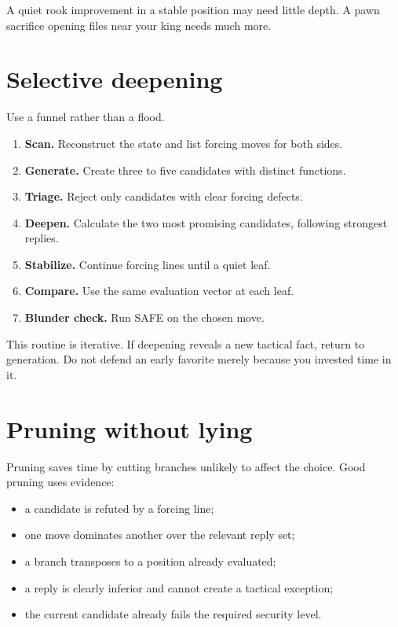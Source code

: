 A quiet rook improvement in a stable position may need little depth. A pawn sacrifice opening files near your king needs much more.

\section{Selective deepening}
Use a funnel rather than a flood.

\begin{enumerate}[label=\textbf{Stage \arabic*:},leftmargin=5.3em]
\item \textbf{Scan.} Reconstruct the state and list forcing moves for both sides.
\item \textbf{Generate.} Create three to five candidates with distinct functions.
\item \textbf{Triage.} Reject only candidates with clear forcing defects.
\item \textbf{Deepen.} Calculate the two most promising candidates, following strongest replies.
\item \textbf{Stabilize.} Continue forcing lines until a quiet leaf.
\item \textbf{Compare.} Use the same evaluation vector at each leaf.
\item \textbf{Blunder check.} Run SAFE on the chosen move.
\end{enumerate}

This routine is iterative. If deepening reveals a new tactical fact, return to generation. Do not defend an early favorite merely because you invested time in it.

\section{Pruning without lying}
Pruning saves time by cutting branches unlikely to affect the choice. Good pruning uses evidence:

\begin{itemize}[leftmargin=1.4em]
\item a candidate is refuted by a forcing line;
\item one move dominates another over the relevant reply set;
\item a branch transposes to a position already evaluated;
\item a reply is clearly inferior and cannot create a tactical exception;
\item the current candidate already fails the required security level.
\end{itemize}

